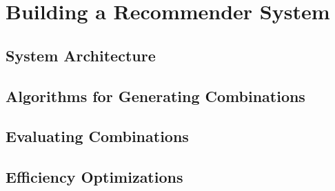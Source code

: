\chapter{Building a Recommender System}

\section{System Architecture}

\section{Algorithms for Generating Combinations}

\section{Evaluating Combinations}

\section{Efficiency Optimizations}